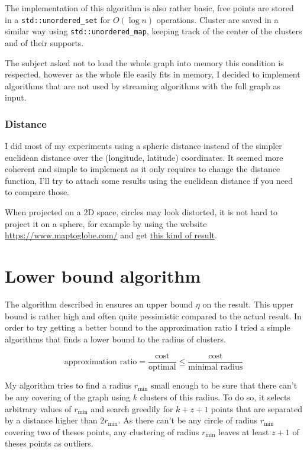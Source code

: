 \documentclass{article}
\begin{document}
      \sloppy
      The implementation of this algorithm is also rather basic, free points
      are stored in a \texttt{std::unordered\_set} for $O(\log n)$ operations.
      Cluster are saved in a similar way using \texttt{std::unordered\_map},
      keeping track of the center of the clusters and of their supports.

      The subject asked not to load the whole graph into memory this condition
      is respected, however as the whole file easily fits in memory, I decided
      to implement algorithms that are not used by streaming algorithms with
      the full graph as input.

    \subsubsection{Distance}

      I did most of my experiments using a spheric distance instead of the
      simpler euclidean distance over the (longitude, latitude) coordinates. It
      seemed more coherent and simple to implement as it only requires to
      change the distance function, I'll try to attach some results using the
      euclidean distance if you need to compare those.

      When projected on a 2D space, circles may look distorted, it is not hard
      to project it on a sphere, for example by using the website
      \url{https://www.maptoglobe.com/} and get \href{https://raw.githubusercontent.com/remi-dupre/cluster-outliers/ressources/maps/streaming_20-50.gif}{this kind of result}.


\section{Lower bound algorithm}

  The algorithm described in \cite{MK08} ensures an upper bound $\eta$ on the
  result. This upper bound is rather high and often quite pessimistic compared
  to the actual result. In order to try getting a better bound to the
  approximation ratio I tried a simple algorithms that finds a lower bound to
  the radius of clusters.

  $$\text{approximation\ ratio} = \frac{\text{cost}}{\text{optimal}} \leq
  \frac{\text{cost}}{\text{minimal\ radius}}$$

  My algorithm tries to find a radius $r_{\min}$ small enough to be sure that
  there can't be any covering of the graph using $k$ clusters of this radius.
  To do so, it selects arbitrary values of $r_{\min}$ and search greedily for
  $k + z + 1$ points that are separated by a distance higher than $2 r_{\min}$.
  As there can't be any circle of radius $r_{\min}$ covering two of theses
  points, any clustering of radius $r_{\min}$ leaves at least $z + 1$ of theses
  points as outliers.
\end{document}
